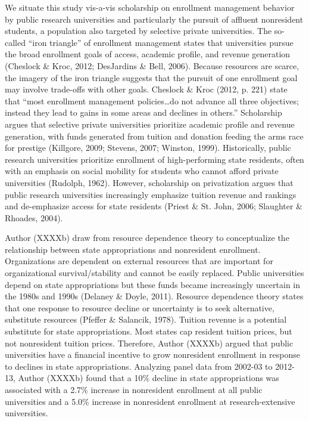 \documentclass[
  12pt,
]{article}
\begin{document}
We situate this study vis-a-vis scholarship on enrollment management behavior by public research universities and particularly the pursuit of affluent nonresident students, a population also targeted by selective private universities. The so-called ``iron triangle'' of enrollment management states that universities pursue the broad enrollment goals of access, academic profile, and revenue generation (Cheslock \& Kroc, 2012; DesJardins \& Bell, 2006). Because resources are scarce, the imagery of the iron triangle suggests that the pursuit of one enrollment goal may involve trade-offs with other goals. Cheslock \& Kroc (2012, p. 221) state that ``most enrollment management policies\ldots do not advance all three objectives; instead they lead to gains in some areas and declines in others.'' Scholarship argues that selective private universities prioritize academic profile and revenue generation, with funds generated from tuition and donation feeding the arms race for prestige (Killgore, 2009; Stevens, 2007; Winston, 1999). Historically, public research universities prioritize enrollment of high-performing state residents, often with an emphasis on social mobility for students who cannot afford private universities (Rudolph, 1962). However, scholarship on privatization argues that public research universities increasingly emphasize tuition revenue and rankings and de-emphasize access for state residents (Priest \& St. John, 2006; Slaughter \& Rhoades, 2004).

Author (XXXXb) draw from resource dependence theory to conceptualize the relationship between state appropriations and nonresident enrollment. Organizations are dependent on external resources that are important for organizational survival/stability and cannot be easily replaced. Public universities depend on state appropriations but these funds became increasingly uncertain in the 1980s and 1990s (Delaney \& Doyle, 2011). Resource dependence theory states that one response to resource decline or uncertainty is to seek alternative, substitute resources (Pfeffer \& Salancik, 1978). Tuition revenue is a potential substitute for state appropriations. Most states cap resident tuition prices, but not nonresident tuition prices. Therefore, Author (XXXXb) argued that public universities have a financial incentive to grow nonresident enrollment in response to declines in state appropriations. Analyzing panel data from 2002-03 to 2012-13, Author (XXXXb) found that a 10\% decline in state appropriations was associated with a 2.7\% increase in nonresident enrollment at all public universities and a 5.0\% increase in nonresident enrollment at research-extensive universities.
\end{document}
